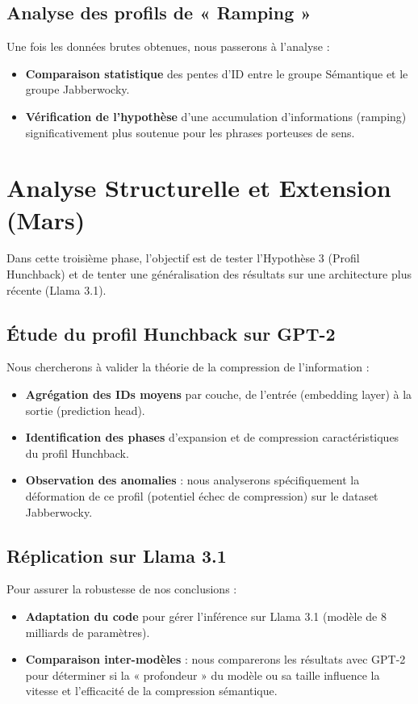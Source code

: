 \subsection{Analyse des profils de « Ramping »}
Une fois les données brutes obtenues, nous passerons à l'analyse :
\begin{itemize}
    \item \textbf{Comparaison statistique} des pentes d'ID entre le groupe Sémantique et le groupe Jabberwocky.
    \item \textbf{Vérification de l'hypothèse} d'une accumulation d'informations (ramping) significativement plus soutenue pour les phrases porteuses de sens.
\end{itemize}

\section{Analyse Structurelle et Extension (Mars)}

Dans cette troisième phase, l'objectif est de tester l'Hypothèse 3 (Profil Hunchback) et de tenter une généralisation des résultats sur une architecture plus récente (Llama 3.1).

\subsection{Étude du profil Hunchback sur GPT-2}
Nous chercherons à valider la théorie de la compression de l'information :
\begin{itemize}
    \item \textbf{Agrégation des IDs moyens} par couche, de l'entrée (embedding layer) à la sortie (prediction head).
    \item \textbf{Identification des phases} d'expansion et de compression caractéristiques du profil Hunchback.
    \item \textbf{Observation des anomalies} : nous analyserons spécifiquement la déformation de ce profil (potentiel échec de compression) sur le dataset Jabberwocky.
\end{itemize}

\subsection{Réplication sur Llama 3.1}
Pour assurer la robustesse de nos conclusions :
\begin{itemize}
    \item \textbf{Adaptation du code} pour gérer l'inférence sur Llama 3.1 (modèle de 8 milliards de paramètres).
    \item \textbf{Comparaison inter-modèles} : nous comparerons les résultats avec GPT-2 pour déterminer si la « profondeur » du modèle ou sa taille influence la vitesse et l'efficacité de la compression sémantique.
\end{itemize}

